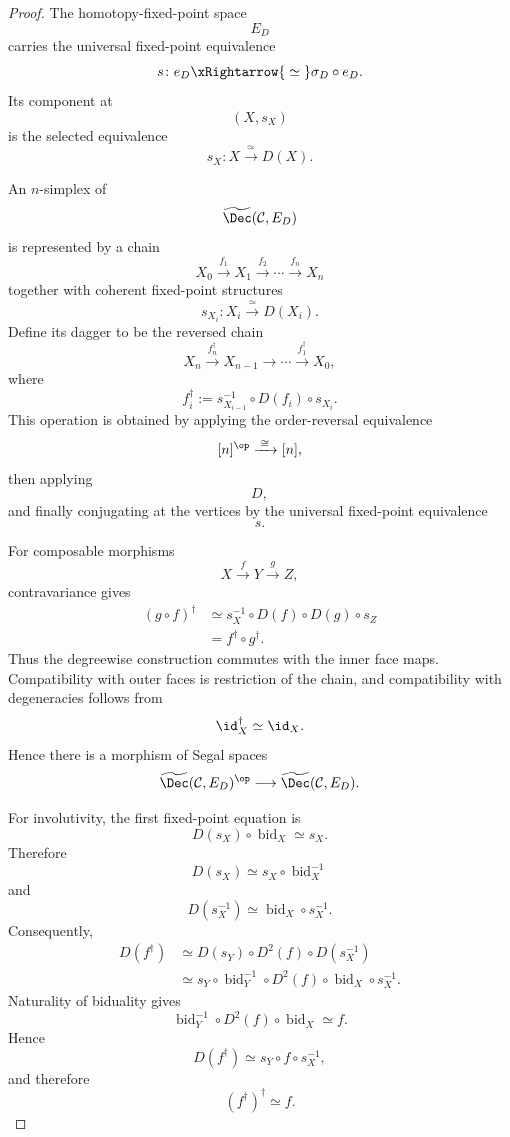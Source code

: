 \begin{proof}
The homotopy-fixed-point space
\[
    E_D
\]
carries the universal fixed-point equivalence
\[
    s
    \colon
    e_D
    \xRightarrow{\;\simeq\;}
    \sigma_D\circ e_D.
\]
Its component at
\[
    (X,s_X)
\]
is the selected equivalence
\[
    s_X
    \colon
    X
    \xrightarrow{\;\simeq\;}
    D(X).
\]

An $n$-simplex of
\[
    \widetilde{\Dec}(\mathcal C,E_D)
\]
is represented by a chain
\[
    X_0
    \xrightarrow{f_1}
    X_1
    \xrightarrow{f_2}
    \cdots
    \xrightarrow{f_n}
    X_n
\]
together with coherent fixed-point structures
\[
    s_{X_i}
    \colon
    X_i
    \xrightarrow{\;\simeq\;}
    D(X_i).
\]
Define its dagger to be the reversed chain
\[
    X_n
    \xrightarrow{f_n^\dagger}
    X_{n-1}
    \longrightarrow
    \cdots
    \xrightarrow{f_1^\dagger}
    X_0,
\]
where
\[
    f_i^\dagger
    :=
    s_{X_{i-1}}^{-1}
    \circ
    D(f_i)
    \circ
    s_{X_i}.
\]
This operation is obtained by applying the order-reversal equivalence
\[
    [n]^{\op}
    \xrightarrow{\;\cong\;}
    [n],
\]
then applying
\[
    D,
\]
and finally conjugating at the vertices by the universal fixed-point
equivalence
\[
    s.
\]

For composable morphisms
\[
    X
    \xrightarrow{f}
    Y
    \xrightarrow{g}
    Z,
\]
contravariance gives
\[
\begin{aligned}
    (g\circ f)^\dagger
    &\simeq
    s_X^{-1}
    \circ
    D(f)
    \circ
    D(g)
    \circ
    s_Z
    \\
    &=
    f^\dagger
    \circ
    g^\dagger.
\end{aligned}
\]
Thus the degreewise construction commutes with the inner face maps.
Compatibility with outer faces is restriction of the chain, and
compatibility with degeneracies follows from
\[
    \id_X^\dagger
    \simeq
    \id_X.
\]
Hence there is a morphism of Segal spaces
\[
    \widetilde{\Dec}(\mathcal C,E_D)^{\op}
    \longrightarrow
    \widetilde{\Dec}(\mathcal C,E_D).
\]

For involutivity, the first fixed-point equation is
\[
    D(s_X)\circ\operatorname{bid}_X
    \simeq
    s_X.
\]
Therefore
\[
    D(s_X)
    \simeq
    s_X\circ\operatorname{bid}_X^{-1}
\]
and
\[
    D(s_X^{-1})
    \simeq
    \operatorname{bid}_X\circ s_X^{-1}.
\]
Consequently,
\[
\begin{aligned}
    D(f^\dagger)
    &\simeq
    D(s_Y)
    \circ
    D^2(f)
    \circ
    D(s_X^{-1})
    \\
    &\simeq
    s_Y
    \circ
    \operatorname{bid}_Y^{-1}
    \circ
    D^2(f)
    \circ
    \operatorname{bid}_X
    \circ
    s_X^{-1}.
\end{aligned}
\]
Naturality of biduality gives
\[
    \operatorname{bid}_Y^{-1}
    \circ
    D^2(f)
    \circ
    \operatorname{bid}_X
    \simeq
    f.
\]
Hence
\[
    D(f^\dagger)
    \simeq
    s_Y\circ f\circ s_X^{-1},
\]
and therefore
\[
    (f^\dagger)^\dagger
    \simeq
    f.
\]


\end{proof}
